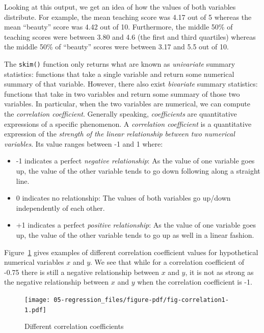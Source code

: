 \documentclass[
  letterpaper,
  DIV=11,
  numbers=noendperiod]{scrreprt}
\providecommand{\tightlist}{%
  \setlength{\itemsep}{0pt}\setlength{\parskip}{0pt}}\usepackage{longtable,booktabs,array}
\theoremstyle{definition}
\theoremstyle{remark}
\begin{document}
Looking at this output, we get an idea of how the values of both
variables distribute. For example, the mean teaching score was 4.17 out
of 5 whereas the mean ``beauty'' score was 4.42 out of 10. Furthermore,
the middle 50\% of teaching scores were between 3.80 and 4.6 (the first
and third quartiles) whereas the middle 50\% of ``beauty'' scores were
between 3.17 and 5.5 out of 10.

The \texttt{skim()} function only returns what are known as
\emph{univariate} summary statistics: functions that take a single
variable and return some numerical summary of that variable. However,
there also exist \emph{bivariate} summary statistics: functions that
take in two variables and return some summary of those two variables. In
particular, when the two variables are numerical, we can compute the
\emph{correlation coefficient}. Generally speaking, \emph{coefficients}
are quantitative expressions of a specific phenomenon. A
\emph{correlation coefficient} is a quantitative expression of the
\emph{strength of the linear relationship between two numerical
variables}. Its value ranges between -1 and 1 where:

\begin{itemize}
\tightlist
\item
  -1 indicates a perfect \emph{negative relationship}: As the value of
  one variable goes up, the value of the other variable tends to go down
  following along a straight line.
\item
  0 indicates no relationship: The values of both variables go up/down
  independently of each other.
\item
  +1 indicates a perfect \emph{positive relationship}: As the value of
  one variable goes up, the value of the other variable tends to go up
  as well in a linear fashion.
\end{itemize}

Figure~\ref{fig-correlation1} gives examples of different correlation
coefficient values for hypothetical numerical variables \(x\) and \(y\).
We see that while for a correlation coefficient of -0.75 there is still
a negative relationship between \(x\) and \(y\), it is not as strong as
the negative relationship between \(x\) and \(y\) when the correlation
coefficient is -1.

\begin{figure}

{\centering \texttt{[image: 05-regression\_files/figure-pdf/fig-correlation1-1.pdf]}

}

\caption{\label{fig-correlation1}Different correlation coefficients}

\end{figure}
\end{document}
